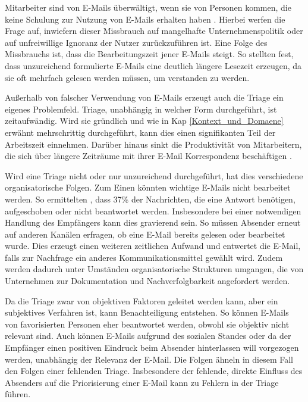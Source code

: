 Mitarbeiter sind von E-Mails überwältigt, wenn sie von Personen kommen, die keine Schulung zur Nutzung von E-Mails erhalten haben \citep[S. 179, 194]{Dawley2003}. Hierbei werfen \cite[S. 77]{Lagrana2016} die Frage auf, inwiefern dieser Missbrauch auf mangelhafte Unternehmenspolitik oder auf unfreiwillige Ignoranz der Nutzer zurückzuführen ist. Eine Folge des Missbrauchs ist, dass die Bearbeitungszeit jener E-Mails steigt. So stellten \cite[S. 1331 f.]{Friedman2003} fest, dass unzureichend formulierte E-Mails eine deutlich längere Lesezeit erzeugen, da sie oft mehrfach gelesen werden müssen, um verstanden zu werden.

Außerhalb von falscher Verwendung von E-Mails erzeugt auch die Triage ein eigenes Problemfeld. Triage, unabhängig in welcher Form durchgeführt, ist zeitaufwändig. Wird sie gründlich und wie in Kap \ref{Kontext_und_Domaene} erwähnt mehrschrittig durchgeführt, kann dies einen signifikanten Teil der Arbeitszeit einnehmen. Darüber hinaus sinkt die Produktivität von Mitarbeitern, die sich über längere Zeiträume mit ihrer E-Mail Korrespondenz beschäftigen \citep[S. 1723 f.]{Mark2016}.

Wird eine Triage nicht oder nur unzureichend durchgeführt, hat dies verschiedene organisatorische Folgen. Zum Einen könnten wichtige E-Mails nicht bearbeitet werden. So ermittelten \cite{Dabbish2006}, dass 37\% der Nachrichten, die eine Antwort benötigen, aufgeschoben oder nicht beantwortet werden. Insbesondere bei einer notwendigen Handlung des Empfängers kann dies gravierend sein. So müssen Absender erneut auf anderen Kanälen erfragen, ob eine E-Mail bereits gelesen oder bearbeitet wurde. Dies erzeugt einen weiteren zeitlichen Aufwand und entwertet die E-Mail, falls zur Nachfrage ein anderes Kommunikationsmittel gewählt wird. Zudem werden dadurch unter Umständen organisatorische Strukturen umgangen, die von Unternehmen zur Dokumentation und Nachverfolgbarkeit angefordert werden.

Da die Triage zwar von objektiven Faktoren geleitet werden kann, aber ein subjektives Verfahren ist, kann Benachteiligung entstehen. So können E-Mails von favorisierten Personen eher beantwortet werden, obwohl sie objektiv nicht relevant sind. Auch können E-Mails aufgrund des sozialen Standes oder da der Empfänger einen positiven Eindruck beim Absender hinterlassen will vorgezogen werden, unabhängig der Relevanz der E-Mail. Die Folgen ähneln in diesem Fall den Folgen einer fehlenden Triage. Insbesondere der fehlende, direkte Einfluss des Absenders auf die Priorisierung einer E-Mail kann zu Fehlern in der Triage führen.

